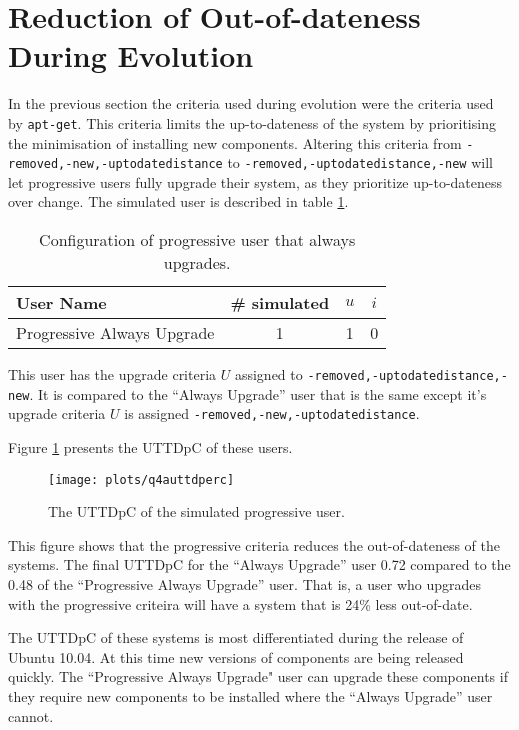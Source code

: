 \section{Reduction of Out-of-dateness During Evolution}
\label{exp.q2}
\label{exp.prouttdsection}
In the previous section the criteria used during evolution were the criteria used by \texttt{apt-get}.
This criteria limits the up-to-dateness of the system by prioritising the minimisation of installing new components.
Altering this criteria from \texttt{-removed,-new,-uptodatedistance} to \texttt{-removed,-uptodatedistance,-new} 
will let progressive users fully upgrade their system, as they prioritize up-to-dateness over change.
The simulated user is described in table \ref{exp.tblq4ausers}.
\begin{table}[h!]
\centering
\begin{tabular}{|l | c | c | c |}
\hline
User Name 								& \# simulated 			& $u$ 		& $i$ 			\\ \hline
Progressive Always Upgrade				& 1 			 	& 1				& 0\\ \hline
\end{tabular}
\caption{Configuration of progressive user that always upgrades.}
\label{exp.tblq4ausers}
\end{table}
This user has the upgrade criteria $U$ assigned to \texttt{-removed,-uptodatedistance,-new}.
It is compared to the ``Always Upgrade'' user that is the same except it's upgrade criteria $U$ is assigned \texttt{-removed,-new,-uptodatedistance}.

Figure \ref{exp.q4auttdperc} presents the UTTDpC of these users.
\begin{figure}[htp]
\begin{center}
  \texttt{[image: plots/q4auttdperc]}
  \caption{The UTTDpC of the simulated progressive user.}
  \label{exp.q4auttdperc}
\end{center}
\end{figure}

This figure shows that the progressive criteria reduces the out-of-dateness of the systems.
The final UTTDpC for the ``Always Upgrade'' user 0.72 compared to the 0.48 of the ``Progressive Always Upgrade'' user.
That is, a user who upgrades with the progressive criteira will have a system that is 24\% less out-of-date.

The UTTDpC of these systems is most differentiated during the release of Ubuntu 10.04.
At this time new versions of components are being released quickly.
The ``Progressive Always Upgrade" user can upgrade these components if they require new components to be installed where the ``Always Upgrade'' user cannot.

